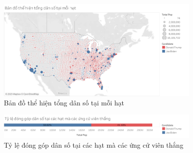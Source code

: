 \documentclass[14pt, a4paper]{article}
\numberwithin{equation}{section}
\numberwithin{figure}{section}
\numberwithin{dl}{section}
\numberwithin{md}{section}
\numberwithin{bd}{section}
\numberwithin{dn}{section}
\numberwithin{hq}{section}
\begin{document}
    \begin{figure}[h!]
        \centering
        \includegraphics[width=0.9\textwidth]{figures/County_Total_Population_Circle.png}
        \caption{Bản đồ thể hiện tổng dân số tại mỗi hạt}
    \end{figure}

    \begin{figure}[h!]
        \centering
        \includegraphics[width=0.9\textwidth]{figures/County_Percentage_Population_Candidate.png}
        \caption{Tỷ lệ đóng góp dân số tại các hạt mà các ứng cử viên thắng}
    \end{figure}
\end{document}
